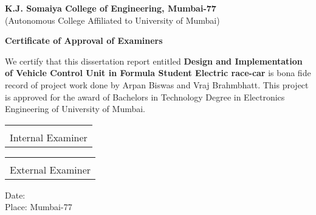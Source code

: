 \newpage
    \begin{center}
    
        \vspace*{0.1cm}
        \large
        \textbf{K.J. Somaiya College of Engineering, Mumbai-77}\\
        \normalsize
        (Autonomous College Affiliated to University of Mumbai)\\
        
        \vspace{0.8cm}
        
        \large
        \textbf{Certificate of Approval of Examiners}\\
        \vspace{0.5cm}
        
    \end{center}

\noindent
{\large We certify that this dissertation report entitled \textbf{Design and Implementation of Vehicle Control Unit in Formula Student Electric race-car} is bona fide record of project work done by Arpan Biswas and Vraj Brahmbhatt.
This project is approved for the award of Bachelors in Technology Degree in Electronics Engineering of University of Mumbai.} 
\vspace{2cm}

\begin{table}[h]
\centering
\begin{tabular}{Y}
\hrulefill\\
\large Internal Examiner\\
\end{tabular}
\end{table}

\vspace{2cm}

\begin{table}[h]
\centering
\begin{tabular}{Y}
\hrulefill\\
\large External Examiner
\end{tabular}
\end{table}

\vspace{1cm}
\noindent
{\large Date:}\\
{\large Place: Mumbai-77}